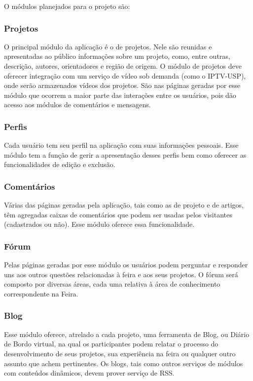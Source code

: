     O módulos planejados para o projeto são:

    \subsubsection{Projetos}
      O principal módulo da aplicação é o de projetos. Nele são reunidas e apresentadas ao público informações sobre um projeto, como, entre outras, descrição, autores, orientadores e região de origem. O módulo de projetos deve oferecer integração com um serviço de vídeo sob demanda (como o IPTV-USP), onde serão armazenados vídeos dos projetos. São nas páginas geradas por esse módulo que ocorrem a maior parte das interações entre os usuários, pois dão acesso aos módulos de comentários e mensagens.

    \subsubsection{Perfis}
      Cada usuário tem seu perfil na aplicação com suas informações pessoais. Esse módulo tem a função de gerir a apresentação desses perfis bem como oferecer as funcionalidades de edição e exclusão.

    \subsubsection{Comentários}
      Várias das páginas geradas pela aplicação, tais como as de projeto e de artigos, têm agregadas caixas de comentários que podem ser usadas pelos visitantes (cadastrados ou não). Esse módulo oferece essa funcionalidade.

    \subsubsection{Fórum}
      Pelas páginas geradas por esse módulo os usuários podem perguntar e responder uns aos outros questões relacionadas à feira e aos seus projetos. O fórum será composto por diversas áreas, cada uma relativa à área de conhecimento correspondente na Feira.

    \subsubsection{Blog}
      Esse módulo oferece, atrelado a cada projeto, uma ferramenta de Blog, ou Diário de Bordo virtual, na qual os participantes podem relatar o processo do desenvolvimento de seus projetos, sua experiência na feira ou qualquer outro assunto que achem pertinentes. Os blogs, tais como outros serviços de módulos com conteúdos dinâmicos, devem prover serviço de RSS.

